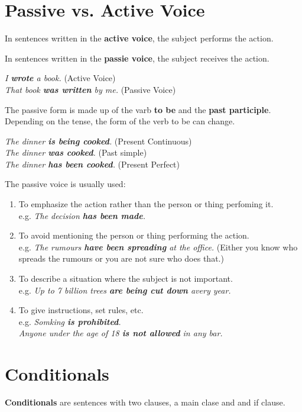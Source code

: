 \documentclass[hidelinks,10pt,a4paper]{article}
\begin{document}
\section{Passive vs. Active Voice}
In sentences written in the \textbf{active voice}, the subject performs the action.

In sentences written in the \textbf{passie voice}, the subject receives the action.

\begin{center}
	\textit{I \textbf{wrote} a book.} (Active Voice) \\
	\textit{That book \textbf{was written} by me.} (Passive Voice)
\end{center}

The passive form is made up of the varb \textbf{to be} and the \textbf{past participle}. Depending on the tense, the form of the verb to be can change.

\begin{center}
	\textit{The dinner \textbf{is being cooked}.} (Present Continuous)\\
	\textit{The dinner \textbf{was cooked}.} (Past simple)\\
	\textit{The dinner \textbf{has been cooked}.} (Present Perfect)
\end{center}

The passive voice is usually used:
\begin{enumerate}[label=(\alph*)]
	\item To emphasize the action rather than the person or thing perfoming it. \\
		e.g. \textit{The decision \textbf{has been made}.}
	\item To avoid mentioning the person or thing performing the action. \\
		e.g. \textit{The rumours \textbf{have been spreading} at the office.} (Either you know who spreads the rumours or you are not sure who does that.)
	\item To describe a situation where the subject is not important. \\
		e.g. \textit{Up to 7 billion trees \textbf{are being cut down} avery year.}
	\item To give instructions, set rules, etc. \\
		e.g. \textit{Somking \textbf{is prohibited}.\\
		Anyone under the age of 18 \textbf{is not allowed} in any bar.}
\end{enumerate}

\section{Conditionals}
\textbf{Conditionals} are sentences with two clauses, a main clase and and if clause.
\end{document}
